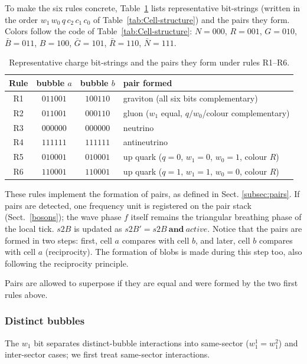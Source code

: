 \documentclass{ijuc}
\begin{document}
To make the six rules concrete, Table~\ref{tab:charge-examples} lists representative bit-strings (written in the order $w_{1}\,w_{0}\,q\,c_{2}\,c_{1}\,c_{0}$ of Table~\ref{tab:Cell-structure}) and the pairs they form.  Colors follow the code of Table~\ref{tab:Cell-structure}: $N=000$, $R=001$, $G=010$, $\bar{B}=011$, $B=100$, $\bar{G}=101$, $\bar{R}=110$, $\bar{N}=111$.

\begin{table}[h]
\centering
\caption{Representative charge bit-strings and the pairs they form under rules R1--R6.}
\label{tab:charge-examples}
\begin{tabular}{|c|c|c|l|}
\hline
Rule & bubble $a$ & bubble $b$ & pair formed\\
\hline
R1 & $011001$ & $100110$ & graviton (all six bits complementary)\\
R2 & $011001$ & $000110$ & gluon ($w_1$ equal, $q/w_0$/colour complementary)\\
R3 & $000000$ & $000000$ & neutrino\\
R4 & $111111$ & $111111$ & antineutrino\\
R5 & $010001$ & $010001$ & up quark ($q{=}0$, $w_1{=}0$, $w_0{=}1$, colour $R$)\\
R6 & $110001$ & $110001$ & up quark ($q{=}1$, $w_1{=}1$, $w_0{=}0$, colour $R$)\\
\hline
\end{tabular}
\end{table}

These rules implement the formation of pairs, as defined in Sect. \ref{subsec:pairs}. 
If pairs are detected, one frequency unit is registered on the pair stack (Sect.~\ref{bosons}); the wave phase $f$ itself remains the triangular breathing phase of the local tick.
$s2B$ is updated as $s2B' = s2B \ \textbf{and} \ \mathit{active}$. 
Notice that the pairs are formed in two steps: first, cell $a$ compares with cell $b$, and later, cell $b$ compares with cell $a$ (reciprocity).
The formation of blobs is made during this step too, also following the reciprocity principle. 

Pairs are allowed to superpose if they are equal and were formed by the two first rules above.

\subsubsection{Distinct bubbles} \label{subsec:distinct}
The $w_1$ bit separates distinct-bubble interactions into same-sector ($w_1^1=w_1^2$) and inter-sector cases; we first treat same-sector interactions.
\end{document}
